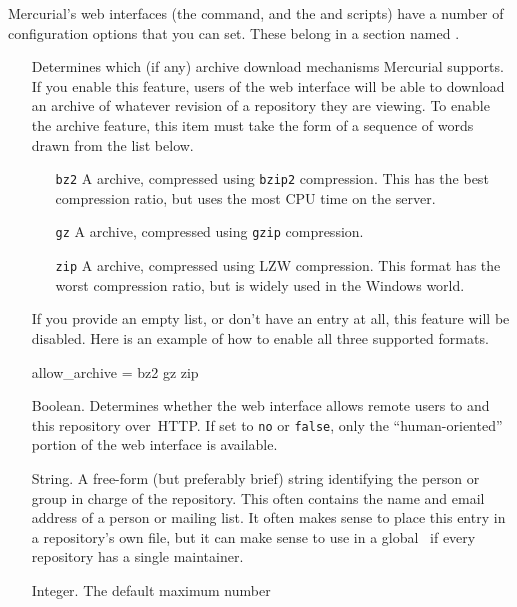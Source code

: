 Mercurial's web interfaces (the  command, and the
 and  scripts) have a
number of configuration options that you can set.  These belong in a
section named .
\begin{itemize}
\item[\rcitem{web}{allow\_archive}] Determines which (if any) archive
  download mechanisms Mercurial supports.  If you enable this
  feature, users of the web interface will be able to download an
  archive of whatever revision of a repository they are viewing.
  To enable the archive feature, this item must take the form of a
  sequence of words drawn from the list below.
  \begin{itemize}
  \item[\texttt{bz2}] A  archive, compressed using
    \texttt{bzip2} compression.  This has the best compression ratio,
    but uses the most CPU time on the server.
  \item[\texttt{gz}] A  archive, compressed using
    \texttt{gzip} compression.
  \item[\texttt{zip}] A  archive, compressed using LZW
    compression.  This format has the worst compression ratio, but is
    widely used in the Windows world.
  \end{itemize}
  If you provide an empty list, or don't have an
   entry at all, this feature will be
  disabled.  Here is an example of how to enable all three supported
  formats.
  \begin{codesample4}
    [web]
    allow_archive = bz2 gz zip
  \end{codesample4}
\item[\rcitem{web}{allowpull}] Boolean.  Determines whether the web
  interface allows remote users to  and  this
  repository over~HTTP.  If set to \texttt{no} or \texttt{false}, only
  the ``human-oriented'' portion of the web interface is available.
\item[\rcitem{web}{contact}] String.  A free-form (but preferably
  brief) string identifying the person or group in charge of the
  repository.  This often contains the name and email address of a
  person or mailing list.  It often makes sense to place this entry in
  a repository's own  file, but it can make sense
  to use in a global \hgrc\ if every repository has a single
  maintainer.
\item[\rcitem{web}{maxchanges}] Integer.  The default maximum number

\end{itemize}
